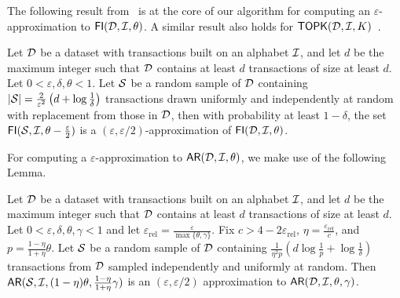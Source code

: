 The following result from~\cite{RiondatoU11} is at the core of our algorithm for
computing an $\varepsilon$-approximation to $\mathsf{FI}({\cal D},{\cal I},\theta)$. A similar
result also holds for $\mathsf{TOPK}({\cal D},{\cal I},K)$~\cite[Lemma 3]{RiondatoU11}.
\begin{lemma}\label{lem:keythmfi}
  \cite[Lemma 1]{RiondatoU11}
   Let ${\cal D}$ be a dataset with transactions built on an alphabet ${\cal I}$, and let
  $d$ be the maximum integer such that ${\cal D}$ contains at least $d$ transactions
  of size at least $d$. Let $0<\varepsilon,\delta,\theta<1$. Let ${\cal S}$ be a random
  sample of ${\cal D}$ containing $|{\cal S}|=
  \frac{2}{\varepsilon^2}\left(d+\log\frac{1}{\delta}\right)$ transactions
  drawn uniformly and independently at random with replacement from those in
  ${\cal D}$, then with probability at least $1-\delta$, the set
  $\mathsf{FI}({\cal S},{\cal I},\theta-\frac{\varepsilon}{2})$ is a
  $(\varepsilon,\varepsilon/2)$-approximation of $\mathsf{FI}({\cal D},{\cal I},\theta)$.
\end{lemma}
For computing a $\varepsilon$-approximation to $\mathsf{AR}({\cal D},{\cal I},\theta)$, we make
use of the following Lemma.
\begin{lemma}\label{lem:keythmar}
 \cite[Lemma 6]{RiondatoU11}
 Let ${\cal D}$ be a dataset with transactions built on an alphabet ${\cal I}$, and let
 $d$ be the maximum integer such that ${\cal D}$ contains at least $d$ transactions
 of size at least $d$. Let $0<\varepsilon,\delta,\theta,\gamma<1$ 
and let $\varepsilon_\mathrm{rel}=\frac{\varepsilon}{\max\{\theta,\gamma\}}$.
Fix $c> 4-2\varepsilon_\mathrm{rel}$, $\eta=\frac{\varepsilon_\mathrm{rel}}{c}$,
and $p=\frac{1-\eta}{1+\eta}\theta$. Let ${\cal S}$ be a random sample of ${\cal D}$
containing $\frac{1}{\eta^2p}(d\log\frac{1}{p}+\log\frac{1}{\delta})$
transactions from ${\cal D}$ sampled independently and uniformly at random. Then
$\mathsf{AR}({\cal S},{\cal I},(1-\eta)\theta,\frac{1-\eta}{1+\eta}\gamma)$ is an
$(\varepsilon,\varepsilon/2)$ approximation to $\mathsf{AR}({\cal D},{\cal I},\theta,\gamma)$.
\end{lemma}

